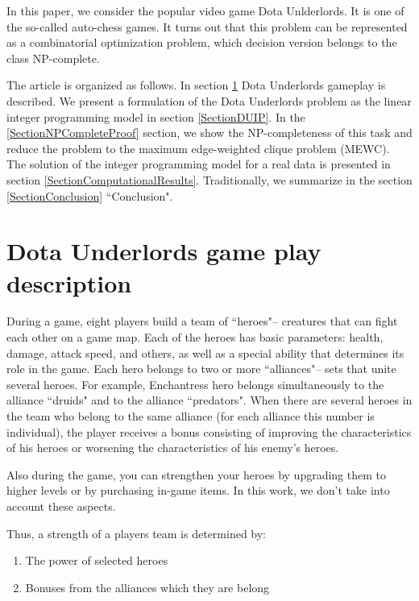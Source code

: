 \documentclass[smallextended]{svjour3}       %
\begin{document}
In this paper, we consider the popular video game Dota Unlderlords. It is one of the so-called auto-chess games. It turns out that this problem can be represented as a combinatorial optimization problem, which decision version  belongs to the class NP-complete.

The article is organized as follows. In section \ref{SectionDUDescription} Dota Underlords gameplay is described.
We present a formulation of the Dota Underlords problem as the linear integer programming model in section \ref{SectionDUIP}. In the \ref{SectionNPCompleteProof} section, we show the NP-completeness of this task and reduce the problem to the maximum edge-weighted clique problem (MEWC). The solution of the integer programming model for a real data is presented in section \ref{SectionComputationalResults}. Traditionally, we summarize in the section \ref{SectionConclusion} ``Conclusion".

\section{Dota Underlords game play description}
\label{SectionDUDescription}

During a game, eight players build a team of ``heroes"-- creatures that can fight each other on a game map. Each of the heroes has basic parameters: health, damage, attack speed, and others, as well as a special ability that determines its role in the game. Each hero belongs to two or more ``alliances"-- sets that unite several heroes. For example, Enchantress hero belongs simultaneously to the alliance ``druids" and to the alliance ``predators". When there are several heroes in the team who belong to the same alliance (for each alliance this number is individual), the player receives a bonus consisting of improving the characteristics of his heroes or worsening the characteristics of his enemy's heroes.

Also during the game, you can strengthen your heroes by upgrading them to higher levels or by purchasing in-game items. In this work, we don't take into account these aspects.

Thus, a strength of a players team is determined by:

\begin{enumerate}
    \item The power of selected heroes
    \item Bonuses from the alliances which they are belong
\end{enumerate}
\end{document}
